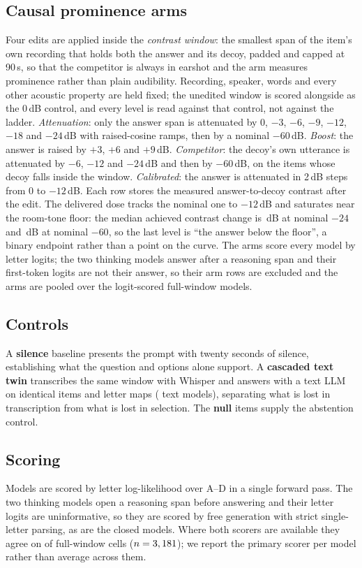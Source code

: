 \documentclass{article}
\begin{document}
\subsection{Causal prominence arms}
\label{ssec:sweep}
Four edits are applied inside the \emph{contrast window}: the smallest span
of the item's own recording that holds both the answer and its decoy, padded
and capped at 90\,s, so that the competitor is always in earshot and the arm
measures prominence rather than plain audibility. Recording, speaker, words
and every other acoustic property are held fixed; the unedited window is
scored alongside as the 0\,dB control, and every level is read against that
control, not against the ladder. \emph{Attenuation}: only the answer span is
attenuated by 0, $-3$, $-6$, $-9$, $-12$, $-18$ and $-24$\,dB with
raised-cosine ramps, then by a nominal $-60$\,dB. \emph{Boost}: the answer is
raised by $+3$, $+6$ and $+9$\,dB. \emph{Competitor}: the decoy's own
utterance is attenuated by $-6$, $-12$ and $-24$\,dB and then by $-60$\,dB,
on the items whose decoy falls inside the window. \emph{Calibrated}: the
answer is attenuated in 2\,dB steps from 0 to $-12$\,dB. Each row stores the
measured answer-to-decoy contrast after the edit. The delivered dose tracks
the nominal one to $-12$\,dB and saturates near the room-tone floor: the
median achieved contrast change is \achievedTwentyfour{}\,dB at nominal
$-24$ and \achievedSixty{}\,dB at nominal $-60$, so the last level is ``the
answer below the floor'', a binary endpoint rather than a point on the
curve. The arms score every model by letter logits; the two thinking models
answer after a reasoning span and their first-token logits are not their
answer, so their arm rows are excluded and the arms are pooled over the
\Nsweeppool{} logit-scored full-window models.
\subsection{Controls}
\label{ssec:controlsetup}
A \textbf{silence} baseline presents the prompt with twenty seconds of
silence, establishing what the question and options alone support. A
\textbf{cascaded text twin} transcribes the same window with Whisper and
answers with a text LLM on identical items and letter maps
(\Ntwins{} text models), separating what is lost in transcription from what
is lost in selection. The \textbf{null} items supply the abstention control.

\subsection{Scoring}
Models are scored by letter log-likelihood over A--D in a single forward
pass. The two thinking models open a reasoning span before answering and
their letter logits are uninformative, so they are scored by free
generation with strict single-letter parsing, as are the closed models. Where
both scorers are available they agree on \scorerAgree{} of full-window cells
($n=3,181{}$); we report the primary scorer per model rather than
average across them.
\end{document}
